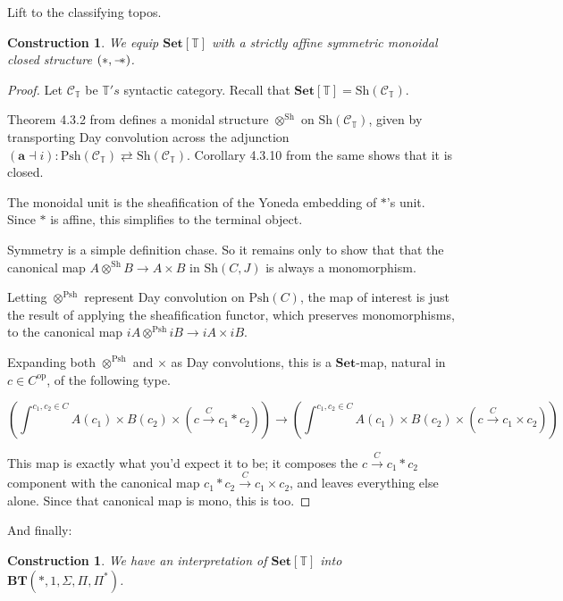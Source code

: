 \documentclass{article}
\newtheorem{construction}[theorem]{Construction}
\newcommand*{\Set}{\mathbf{Set}}
\newcommand*{\Sh}{\mathrm{Sh}}
\newcommand*{\Psh}{\mathrm{Psh}}
\newcommand*{\C}{\mathcal{C}}
\newcommand*{\T}{\mathbb{T}}
\newcommand*{\wand}{\mathbin{-\mkern-6mu*}}
\begin{document}
Lift to the classifying topos.

\begin{construction} \label{sh}
    We equip \(\Set[\T]\) with a strictly affine symmetric monoidal closed structure \((*,\wand)\).
\end{construction}

\begin{proof}
    Let \(\C_\T\) be \(\T's\) syntactic category. Recall that \(\Set[\T] = \Sh(\C_\T)\).

    Theorem 4.3.2 from \cite{biering} defines a monidal structure \(\otimes^\Sh\) on \(\Sh(\C_\T)\),
    given by transporting Day convolution across the adjunction \((\mathbf{a} \dashv i) : \Psh(\C_\T) \rightleftarrows \Sh(\C_\T)\).
    Corollary 4.3.10 from the same shows that it is closed.

    The monoidal unit is the sheafification of the Yoneda embedding of \(*\)'s unit.
    Since \(*\) is affine, this simplifies to the terminal object.

    Symmetry is a simple definition chase. So it remains only to show that
    that the canonical map \(A \otimes^\Sh B \to A \times B\) in \(\Sh(C,J)\) is always a monomorphism.

    Letting \(\otimes^\Psh\) represent Day convolution on \(\Psh(C)\),
    the map of interest is just the result of applying the sheafification functor,
    which preserves monomorphisms, to the canonical map \(iA \otimes^\Psh iB \to iA \times iB\).

    Expanding both \(\otimes^\Psh\) and \(\times\) as Day convolutions,
    this is a \(\Set\)-map, natural in \(c \in C^\mathrm{op}\), of the following type.
    \begin{scriptsize}\[\left(\int^{c_1,c_2 \in C} A(c_1) \times B(c_2) \times (c \xrightarrow{C} c_1 * c_2)\right) \to \left(\int^{c_1,c_2 \in C} A(c_1) \times B(c_2) \times (c \xrightarrow{C} c_1 \times c_2)\right)\]\end{scriptsize}
    This map is exactly what you'd expect it to be; it composes the \(c \xrightarrow{C} c_1 * c_2\) component
    with the canonical map \(c_1 * c_2 \xrightarrow{C} c_1 \times c_2\), and leaves everything else alone.
    Since that canonical map is mono, this is too.
\end{proof}

And finally:

\begin{construction}
    We have an interpretation of \(\Set[\T]\) into \(\mathbf{BT}(*, 1, \Sigma, \Pi, \Pi^*)\).
\end{construction}
\end{document}
